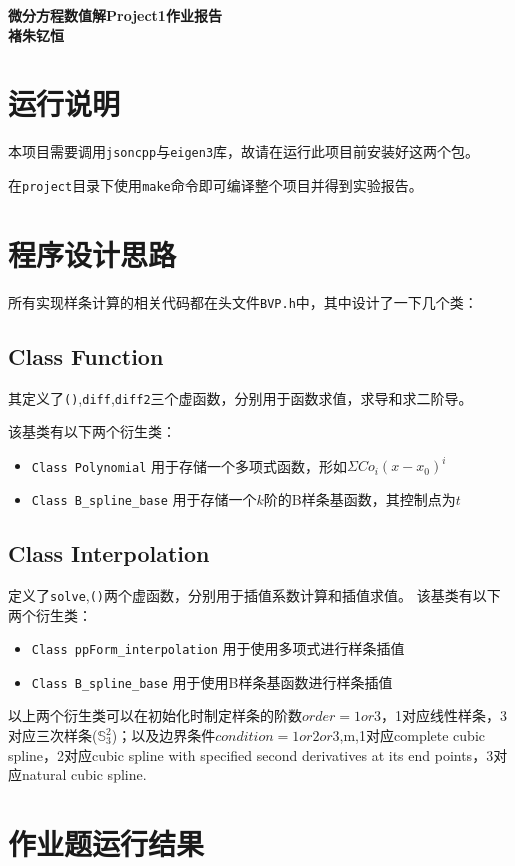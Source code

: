 \documentclass[12]{article}%
\begin{document}
\begin{center}
    \LARGE\songti\textbf{微分方程数值解Project1作业报告} \\%
    \large\kaishu\textbf{褚朱钇恒}%
\end{center}
\section{运行说明}
    本项目需要调用\verb|jsoncpp|与\verb|eigen3|库，故请在运行此项目前安装好这两个包。

    在\verb|project|目录下使用\verb|make|命令即可编译整个项目并得到实验报告。

\section{程序设计思路}
所有实现样条计算的相关代码都在头文件\verb|BVP.h|中，其中设计了一下几个类：
\subsection{Class Function}
其定义了\verb|()|,\verb|diff|,\verb|diff2|三个虚函数，分别用于函数求值，求导和求二阶导。

该基类有以下两个衍生类：
\begin{itemize}
    \item \verb|Class Polynomial| 用于存储一个多项式函数，形如$\Sigma Co_i(x-x_0)^i$
    \item \verb|Class B_spline_base| 用于存储一个$k$阶的B样条基函数，其控制点为$t$
\end{itemize}
\subsection{Class Interpolation}
定义了\verb|solve|,\verb|()|两个虚函数，分别用于插值系数计算和插值求值。
该基类有以下两个衍生类：
\begin{itemize}
    \item \verb|Class ppForm_interpolation| 用于使用多项式进行样条插值
    \item \verb|Class B_spline_base| 用于使用B样条基函数进行样条插值
\end{itemize}
以上两个衍生类可以在初始化时制定样条的阶数$order=1 or 3$，1对应线性样条，3对应三次样条($\mathbb{S}_3^2$)；以及边界条件$condition=1 or 2 or 3$,m,1对应complete cubic spline，2对应cubic spline with specified second derivatives at its
end points，3对应natural cubic spline.

\section{作业题运行结果}
\end{document}
